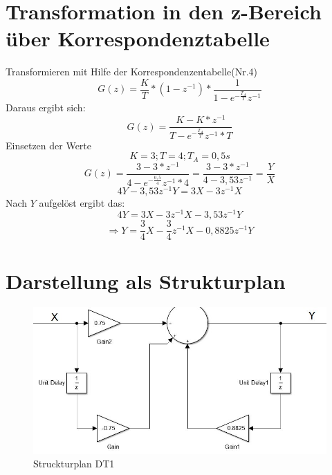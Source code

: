 \documentclass[12pt,a4paper]{report}
\begin{document}
\section{Transformation in den z-Bereich über Korrespondenztabelle}
Transformieren mit Hilfe der Korrespondenzentabelle(Nr.4)
\begin{equation}
G(z) = \frac{K}{T}*(1-z^{-1})*
\frac{1}
{1-e^{-\frac{T_A}{T}}z^{-1}}
\end{equation}
Daraus ergibt sich: 
\begin{equation}
G(z) = \frac{K-K*z^{-1}}
{T-e^{-\frac{T_A}{T}}z^{-1}*T} 
\end{equation}
Einsetzen der Werte
\begin{equation}
K = 3; T = 4; T_A = 0,5s
\end{equation}
\begin{equation}
G(z) = \frac{3-3*z^{-1}}
{4-e^{-\frac{0,5}{4}}z^{-1}*4} = \frac{3-3*z^{-1}}
{4-3,53z^{-1}} = \frac{Y}{X}
\end{equation}
\begin{equation}
4Y- 3,53z^{-1}Y = 3X -3z^{-1}X
\end{equation}
Nach $ Y $ aufgelöst ergibt das:
\begin{equation}
 4Y = 3X- 3z^{-1}X - 3,53z^{-1}Y
\end{equation}
\begin{equation}
\Rightarrow Y = \frac{3}{4}X- \frac{3}{4}z^{-1}X - 0,8825z^{-1}Y
\end{equation}
\section{Darstellung als Strukturplan}
\begin{figure}[ht]
	\centering
	\includegraphics[width=0.8\linewidth]{marius/DT1}
	\caption{Struckturplan DT1}
	\label{fig:DT1}
\end{figure}
\end{document}
